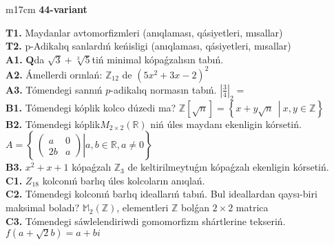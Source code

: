 \documentclass{article}
\begin{document}
\begin{tabular}{m{17cm}}
\textbf{44-variant}
\newline

\textbf{T1.} Maydanlar avtomorfizmleri (anıqlaması, qásiyetleri, mısallar) \\
\textbf{T2.} p-Adikalıq sanlardıń keńisligi (anıqlaması, qásiyetleri, mısallar) \\
\textbf{A1.} \(\mathbf{Q}\)da \(\sqrt{3} + \sqrt[3]{5}\)tiń minimal kópaǵzalısın tabıń. \\
\textbf{A2.} Ámellerdi orınlań: \(\mathbb{Z}_{12}\) de \(\left( 5x^{2} + 3x - 2 \right)^{2}\) \\
\textbf{A3.} Tómendegi sannıń \(p\)-adikalıq normasın tabıń. \(|\frac{3}{4}|_{2} =\) \\
\textbf{B1.} Tómendegi kóplik kolco dúzedi ma? \(\mathbb{Z}\left\lbrack \sqrt{n} \right\rbrack = \left\{ x + y\sqrt{n}\ \ \left| \right.\ x,y \in \mathbb{Z} \right\}\) \\
\textbf{B2.} Tómendegi kóplik\(M_{2 \times 2}\left( \mathbb{R} \right)\) niń úles maydanı ekenligin kórsetiń. \(A = \left\{ \left. \ \begin{pmatrix}
a & 0 \\
2b & a
\end{pmatrix} \right|a,b\mathbb{\in R},a \neq 0 \right\}\) \\
\textbf{B3.} \(x^{2} + x + 1\) kópaǵzalı \(\mathbb{Z}_{3}\) de keltirilmeytuǵın kópaǵzalı ekenligin kórsetiń. \\
\textbf{C1.} \(Z_{18}\) kolconıń barlıq úles kolcoların anıqlań. \\
\textbf{C2.} Tómendegi kolconıń barlıq ideallarıń tabıń. Bul ideallardan qaysı-biri maksimal boladı? \(\mathbb{M}_{2}\left( \mathbb{Z} \right)\), elementleri \(\mathbb{Z}\) bolǵan \(2 \times 2\) matrica \\
\textbf{C3.} Tómendegi sáwlelendiriwdi gomomorfizm shártlerine tekseriń. \(f\left( a + \sqrt{2}b \right) = a + bi\) \\

\end{tabular}
\vspace{1cm}
\end{document}
